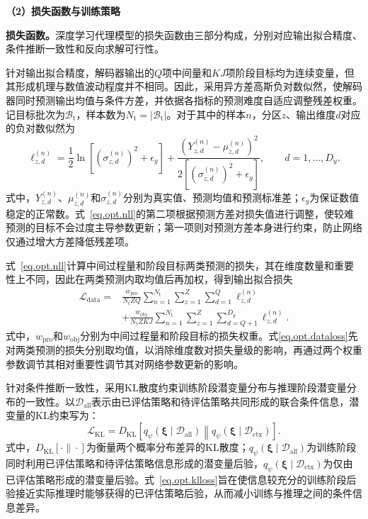 \textbf{（2）损失函数与训练策略}

\textbf{损失函数。}深度学习代理模型的损失函数由三部分构成，分别对应输出拟合精度、条件推断一致性和反向求解可行性。

针对输出拟合精度，解码器输出的$Q$项中间量和$KJ$项阶段目标均为连续变量，但其形成机理与数值波动程度并不相同。因此，采用异方差高斯负对数似然\citep{nixEstimatingMeanVariance1994,lakshminarayananSimpleScalablePredictive2017}，使解码器同时预测输出均值与条件方差，并依据各指标的预测难度自适应调整残差权重。记目标批次为$\mathcal{B}_{\mathrm{t}}$，样本数为$N_{\mathrm{t}}=|\mathcal{B}_{\mathrm{t}}|$。对于其中的样本$n$，分区$z$、输出维度$d$对应的负对数似然为
\begin{equation}
\ell_{z,d}^{(n)}
=
\frac{1}{2}\ln\left[\left(\sigma_{z,d}^{(n)}\right)^2+\epsilon_y\right]
+\frac{\left(Y_{z,d}^{(n)}-\mu_{z,d}^{(n)}\right)^2}
{2\left[\left(\sigma_{z,d}^{(n)}\right)^2+\epsilon_y\right]},
\qquad d=1,\ldots,D_y.
\label{eq.opt.nll}
\end{equation}
式中，$Y_{z,d}^{(n)}$、$\mu_{z,d}^{(n)}$和$\sigma_{z,d}^{(n)}$分别为真实值、预测均值和预测标准差；$\epsilon_y$为保证数值稳定的正常数。式~\eqref{eq.opt.nll}的第二项根据预测方差对损失值进行调整，使较难预测的目标不会过度主导参数更新；第一项则对预测方差本身进行约束，防止网络仅通过增大方差降低残差项。

式~\eqref{eq.opt.nll}计算中间过程量和阶段目标两类预测的损失，其在维度数量和重要性上不同，因此在两类预测内取均值后再加权，得到输出拟合损失
\begin{equation}
\begin{aligned}
\mathcal{L}_{\mathrm{data}}
=&
\frac{w_{\mathrm{pro}}}{N_{\mathrm{t}}ZQ}
\sum_{n=1}^{N_{\mathrm{t}}}
\sum_{z=1}^{Z}\sum_{d=1}^{Q}
\ell_{z,d}^{(n)}\\
&+
\frac{w_{\mathrm{obj}}}{N_{\mathrm{t}}ZKJ}
\sum_{n=1}^{N_{\mathrm{t}}}
\sum_{z=1}^{Z}\sum_{d=Q+1}^{D_y}
\ell_{z,d}^{(n)}.
\end{aligned}
\label{eq.opt.dataloss}
\end{equation}
式中，$w_{\mathrm{pro}}$和$w_{\mathrm{obj}}$分别为中间过程量和阶段目标的损失权重。式\eqref{eq.opt.dataloss}先对两类预测的损失分别取均值，以消除维度数对损失量级的影响，再通过两个权重参数调节其相对重要性调节其对网络参数更新的影响。

针对条件推断一致性，采用KL散度约束训练阶段潜变量分布与推理阶段潜变量分布的一致性。以$\mathcal{D}_{\mathrm{all}}$表示由已评估策略和待评估策略共同形成的联合条件信息，潜变量的KL约束写为：
\begin{equation}
\mathcal{L}_{\mathrm{KL}}
=
D_{\mathrm{KL}}\left[
q_{\psi}\left(
\bm{\xi}\mid\mathcal{D}_{\mathrm{all}}
\right)
\middle\|
q_{\psi}\left(
\bm{\xi}\mid\mathcal{D}_{\mathrm{ctx}}
\right)
\right].
\label{eq.opt.klloss}
\end{equation}
式中，$D_{\mathrm{KL}}[\cdot\|\cdot]$为衡量两个概率分布差异的KL散度；$q_{\psi}(\bm{\xi}\mid\mathcal{D}_{\mathrm{all}})$为训练阶段同时利用已评估策略和待评估策略信息形成的潜变量后验，$q_{\psi}(\bm{\xi}\mid\mathcal{D}_{\mathrm{ctx}})$为仅由已评估策略形成的潜变量后验。式~\eqref{eq.opt.klloss}旨在使信息较充分的训练阶段后验接近实际推理时能够获得的已评估策略后验，从而减小训练与推理之间的条件信息差异。

